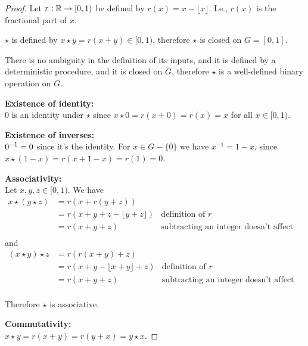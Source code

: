 \begin{proof}
  Let $r: \mathbb{R} \to [0, 1)$ be defined by $r(x) = x - \lfloor x \rfloor$. I.e., $r(x)$ is the fractional part of $x$.

  $\star$ is defined by $x \star y = r(x + y) \in [0, 1)$, therefore $\star$ is closed on $G = [0, 1]$.

  There is no ambiguity in the definition of its inputs, and it is defined by a deterministic
  procedure, and it is closed on $G$, therefore $\star$ is a well-defined binary operation on $G$.

  {\bf Existence of identity:}\\
  $0$ is an identity under $\star$ since $x \star 0 = r(x + 0) = r(x) = x$ for all $x \in [0, 1)$.

  {\bf Existence of inverses:}\\
  $0^{-1} = 0$ since it's the identity.
  For $x \in G - \{0\}$ we have $x^{-1} = 1 - x$, since $x \star (1 - x) = r(x + 1 - x) = r(1) = 0$.

  {\bf Associativity:}\\
  Let $x, y, z \in [0, 1)$. We have
  \begin{align*}
    x \star (y \star z)
    &= r(x + r(y + z)) \\
    &= r(x + y + z - \lfloor y + z \rfloor) &\text{definition of $r$}\\
    &= r(x + y + z)                         &\text{subtracting an integer doesn't affect fractional part}\\
  \end{align*}
  and
\begin{align*}
  (x \star y) \star z
  &= r(r(x + y) + z) \\
  &= r(x + y - \lfloor x + y \rfloor + z)    &\text{definition of $r$}\\
  &= r(x + y + z)                            &\text{subtracting an integer doesn't affect fractional part}\\
\end{align*}

Therefore $\star$ is associative.

  {\bf Commutativity:}\\
  $x \star y = r(x + y) = r(y + x) = y \star x$.
\end{proof}

